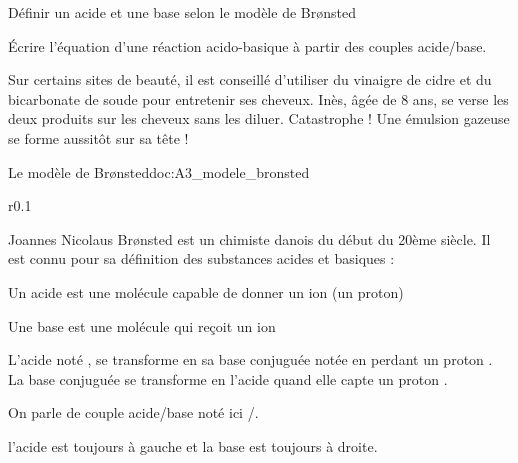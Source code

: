 \tetePremStssChim


\begin{objectifs}
  \item Définir un acide et une base selon le modèle de Br\o{}nsted
  \item Écrire l’équation d’une réaction acido-basique à partir des couples acide/base.
\end{objectifs}

\begin{contexte}
  Sur certains sites de beauté, il est conseillé d’utiliser du vinaigre de cidre et du bicarbonate de soude pour entretenir ses cheveux.
  Inès, âgée de 8 ans, se verse les deux produits sur les cheveux sans les diluer.
  Catastrophe ! Une émulsion gazeuse se forme aussitôt sur sa tête !

\end{contexte}

\begin{doc}{Le modèle de Br\o{}nsted}{doc:A3_modele_bronsted}
  \begin{wrapfigure}[3]{r}{0.1\linewidth}
  \end{wrapfigure}

  Joannes Nicolaus Br\o{}nsted est un chimiste danois du début du 20ème siècle.
  Il est connu pour sa définition des substances acides et basiques : 
  \begin{importants}    
    \begin{listePoints}
      \item Un acide est une molécule capable de donner un ion  (un proton)
      \item Une base est une molécule qui reçoit un ion 
    \end{listePoints}
  \end{importants}
  
  L'acide noté , se transforme en sa base conjuguée notée  en perdant un proton .
  La base conjuguée  se transforme en l'acide  quand elle capte un proton .

  \begin{importants}
    On parle de couple acide/base noté ici /.    
  \end{importants}
  \attention l'acide est toujours à gauche et la base est toujours à droite.

  \exemple
\end{doc}

